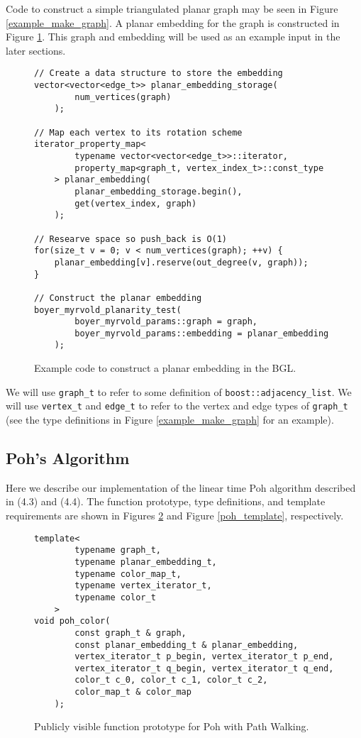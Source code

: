 \documentclass[letterpaper, 12pt]{article}
\theoremstyle{definition}
\theoremstyle{definition}
\theoremstyle{thm}
\theoremstyle{definition}
\begin{document}
Code to construct a simple triangulated planar graph may be seen in Figure
\ref{example_make_graph}. A planar embedding for the graph is constructed
in Figure \ref{example_embed_graph}. 
This graph and embedding will be used as an example input in the later sections.

\begin{figure}
\begin{lstlisting}[frame=single]
// Create a data structure to store the embedding
vector<vector<edge_t>> planar_embedding_storage(
        num_vertices(graph)
    );

// Map each vertex to its rotation scheme
iterator_property_map<
        typename vector<vector<edge_t>>::iterator, 
        property_map<graph_t, vertex_index_t>::const_type
    > planar_embedding(
        planar_embedding_storage.begin(),
        get(vertex_index, graph)
    );

// Researve space so push_back is O(1)
for(size_t v = 0; v < num_vertices(graph); ++v) {
    planar_embedding[v].reserve(out_degree(v, graph));
}

// Construct the planar embedding
boyer_myrvold_planarity_test(
        boyer_myrvold_params::graph = graph,
        boyer_myrvold_params::embedding = planar_embedding
    );
\end{lstlisting}
\caption{Example code to construct a planar embedding in the BGL.}
\label{example_embed_graph}
\end{figure}

We will use \texttt{graph\_t} to refer to some definition of
\texttt{boost::adjacency\_list}. We will use \texttt{vertex\_t} and \texttt{edge\_t}
to refer to the vertex and edge types of \texttt{graph\_t} (see the type
definitions in Figure \ref{example_make_graph} for an example).

\subsection{Poh's Algorithm}

Here we describe our implementation of the linear time Poh algorithm
described in (4.3) and (4.4). The
function prototype, type definitions, and template requirements are shown
in Figures \ref{poh_prototype} and Figure \ref{poh_template}, respectively.

\begin{figure}
\begin{lstlisting}[frame=single]
template<
        typename graph_t,
        typename planar_embedding_t,
        typename color_map_t,
        typename vertex_iterator_t,
        typename color_t
    >
void poh_color(
        const graph_t & graph,
        const planar_embedding_t & planar_embedding,
        vertex_iterator_t p_begin, vertex_iterator_t p_end,
        vertex_iterator_t q_begin, vertex_iterator_t q_end,
        color_t c_0, color_t c_1, color_t c_2,
        color_map_t & color_map
    );
\end{lstlisting}
\caption{Publicly visible function prototype for Poh with Path Walking.}
\label{poh_prototype}
\end{figure}
\end{document}
